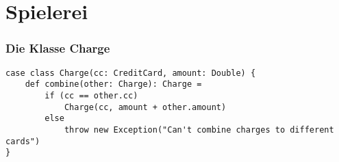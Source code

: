 	\section[Section]{Spielerei}
		\begin{frame}[fragile]
		\frametitle{Die Klasse Charge}
		\begin{lstlisting}[style=myScalastyle]
case class Charge(cc: CreditCard, amount: Double) {
	def combine(other: Charge): Charge =
		if (cc == other.cc)
			Charge(cc, amount + other.amount)
		else
			throw new Exception("Can't combine charges to different cards")		
}
\end{lstlisting}
\end{frame}
		
			